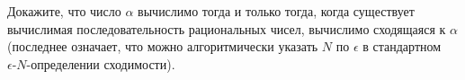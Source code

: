 Докажите, что число $\alpha$ вычислимо тогда и только тогда, когда существует вычислимая последовательность рациональных
чисел, вычислимо сходящаяся к $\alpha$ (последнее означает, что можно алгоритмически указать $N$ по $\epsilon$ в стандартном
$\epsilon\text{-}N$-определении сходимости).
